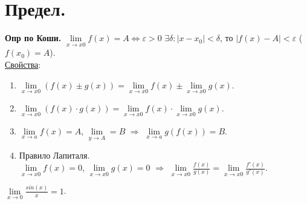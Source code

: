 \documentclass{article}
\begin{document}
	\section{Предел.}
	\textbf{Опр по Коши.} $\lim \limits_{x \rightarrow x0} f(x) = A \Leftrightarrow \varepsilon > 0$ $\exists \delta: |x - x_0| < \delta$, то $|f(x) - A| < \varepsilon$ ($f(x_0) = A$). \\
	\underline{Свойства}:
	\begin{enumerate}
		\item $\lim \limits_{x \rightarrow x0} (f(x) \pm g(x)) = \lim \limits_{x \rightarrow x0} f(x) \pm \lim \limits_{x \rightarrow x0} g(x)$.
		\item $\lim \limits_{x \rightarrow x0} (f(x) \cdot g(x)) = \lim \limits_{x \rightarrow x0} f(x) \cdot \lim \limits_{x \rightarrow x0} g(x)$.
		\item $\lim \limits_{x \rightarrow a} f(x) = A$, $\lim \limits_{y \rightarrow A} = B$ $\Rightarrow$ $\lim \limits_{x \rightarrow a} g(f(x)) = B$.
		\item Правило Лапиталя. \\
		$\lim \limits_{x \rightarrow x0} f(x) = 0$, $\lim \limits_{x \rightarrow x0} g(x) = 0$ $\Rightarrow$ $\lim \limits_{x \rightarrow x0} \frac{f(x)}{g(x)} = \lim \limits_{x \rightarrow x0} \frac{f'(x)}{g'(x)}$.
	\end{enumerate}
	$\lim \limits_{x \rightarrow 0} \frac{sin(x)}{x} = 1$.
\end{document}
